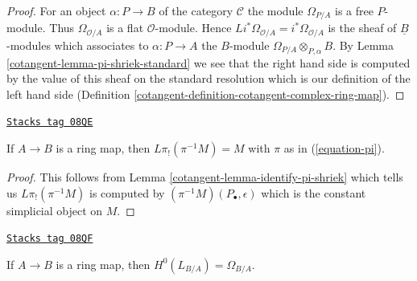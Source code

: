 \begin{proof}

For an object $\alpha : P \to B$ of the category $\mathcal{C}$
the module $\Omega_{P/A}$ is a free $P$-module. Thus
$\Omega_{\mathcal{O}/A}$ is a flat $\mathcal{O}$-module. Hence
$Li^*\Omega_{\mathcal{O}/A} = i^*\Omega_{\mathcal{O}/A}$ is the sheaf
of $\underline{B}$-modules which associates to $\alpha : P \to A$ the
$B$-module $\Omega_{P/A} \otimes_{P, \alpha} B$.
By Lemma \ref{cotangent-lemma-pi-shriek-standard}
we see that the right hand side is computed by
the value of this sheaf on the standard resolution which is our
definition of the left hand side
(Definition \ref{cotangent-definition-cotangent-complex-ring-map}).
\end{proof}

\begin{lemma}
\label{cotangent-lemma-pi-lower-shriek-constant-sheaf}
\href{https://stacks.math.columbia.edu/tag/08QE}{\texttt{Stacks tag 08QE}}

If $A \to B$ is a ring map, then $L\pi_!(\pi^{-1}M) = M$
with $\pi$ as in (\ref{equation-pi}).
\end{lemma}

\begin{proof}

This follows from Lemma \ref{cotangent-lemma-identify-pi-shriek} which tells us
$L\pi_!(\pi^{-1}M)$ is computed by $(\pi^{-1}M)(P_\bullet, \epsilon)$
which is the constant simplicial object on $M$.
\end{proof}

\begin{lemma}[Identify H0]
\label{cotangent-lemma-identify-H0}
\href{https://stacks.math.columbia.edu/tag/08QF}{\texttt{Stacks tag 08QF}}

If $A \to B$ is a ring map, then $H^0(L_{B/A}) = \Omega_{B/A}$.
\end{lemma}

